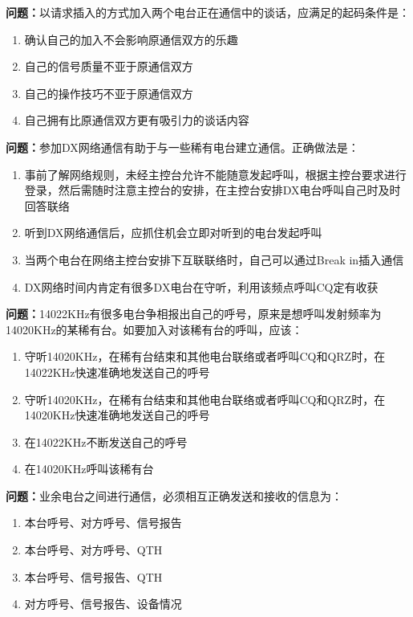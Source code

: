 \bigskip


\noindent\textbf{问题：}以请求插入的方式加入两个电台正在通信中的谈话，应满足的起码条件是：
\begin{enumerate}[label=\Alph*), leftmargin=3em]
\item 确认自己的加入不会影响原通信双方的乐趣
\item 自己的信号质量不亚于原通信双方
\item 自己的操作技巧不亚于原通信双方
\item 自己拥有比原通信双方更有吸引力的谈话内容
\end{enumerate}

\bigskip


\noindent\textbf{问题：}参加DX网络通信有助于与一些稀有电台建立通信。正确做法是：
\begin{enumerate}[label=\Alph*), leftmargin=3em]
\item 事前了解网络规则，未经主控台允许不能随意发起呼叫，根据主控台要求进行登录，然后需随时注意主控台的安排，在主控台安排DX电台呼叫自己时及时回答联络
\item 听到DX网络通信后，应抓住机会立即对听到的电台发起呼叫
\item 当两个电台在网络主控台安排下互联联络时，自己可以通过Break in插入通信
\item DX网络时间内肯定有很多DX电台在守听，利用该频点呼叫CQ定有收获
\end{enumerate}

\bigskip


\noindent\textbf{问题：}14022KHz有很多电台争相报出自己的呼号，原来是想呼叫发射频率为14020KHz的某稀有台。如要加入对该稀有台的呼叫，应该：
\begin{enumerate}[label=\Alph*), leftmargin=3em]
\item 守听14020KHz，在稀有台结束和其他电台联络或者呼叫CQ和QRZ时，在14022KHz快速准确地发送自己的呼号
\item 守听14020KHz，在稀有台结束和其他电台联络或者呼叫CQ和QRZ时，在14020KHz快速准确地发送自己的呼号
\item 在14022KHz不断发送自己的呼号
\item 在14020KHz呼叫该稀有台
\end{enumerate}

\bigskip


\noindent\textbf{问题：}业余电台之间进行通信，必须相互正确发送和接收的信息为：
\begin{enumerate}[label=\Alph*), leftmargin=3em]
\item 本台呼号、对方呼号、信号报告
\item 本台呼号、对方呼号、QTH
\item 本台呼号、信号报告、QTH
\item 对方呼号、信号报告、设备情况
\end{enumerate}

